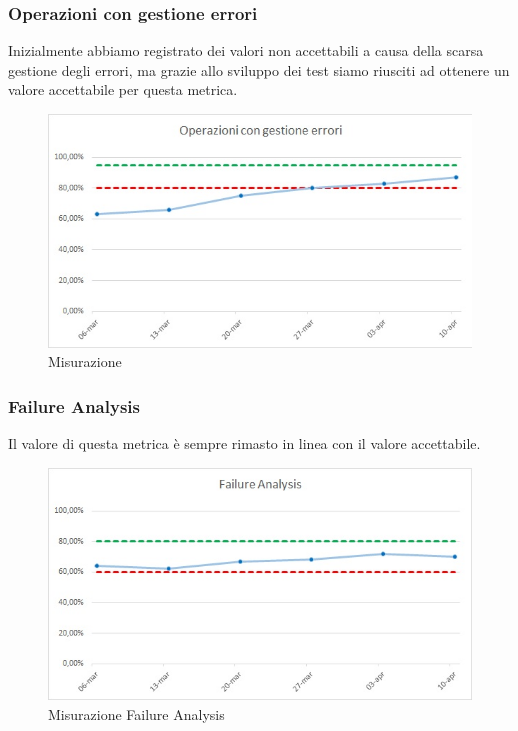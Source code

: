 \subsubsection{Operazioni con gestione errori}
Inizialmente abbiamo registrato dei valori non accettabili a causa della scarsa gestione degli errori, ma grazie allo sviluppo dei test siamo riusciti ad ottenere un valore accettabile per questa metrica.
\begin{figure} [H]
	\centering
	\includegraphics[scale=1]{Img/blocco}
	\caption{Misurazione }\label{}
\end{figure}

\subsubsection{Failure Analysis}
Il valore di questa metrica è sempre rimasto in linea con il valore accettabile.
\begin{figure} [H]
	\centering
	\includegraphics[scale=1]{Img/FA}
	\caption{Misurazione Failure Analysis}\label{}
\end{figure}

